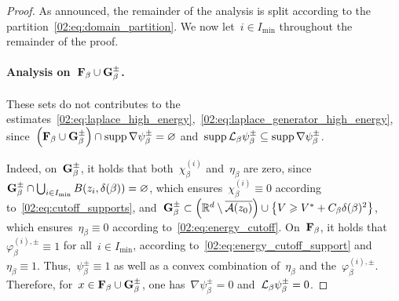 \begin{proof}
            As announced, the remainder of the analysis is split according to the partition~\eqref{02:eq:domain_partition}. We now let~$i\in I_{\min}$ throughout the remainder of the proof.
            \paragraph{Analysis on~$\mathbf{F}_\beta \cup \mathbf{G}_\beta^{\pm}$.\newline}
            These sets do not contributes to the estimates~\eqref{02:eq:laplace_high_energy},~\eqref{02:eq:laplace_generator_high_energy}, since~$\left(\mathbf{F}_\beta\cup\mathbf{G}_\beta^{\pm}\right) \cap \mathrm{supp}\,\nabla \psi^\pm_\beta = \varnothing$ and~$\mathrm{supp}\,\mathcal{L}_\beta\psi_\beta^\pm \subseteq \mathrm{supp}\,\nabla\psi_\beta^\pm$.
            
            Indeed, on~$\mathbf{G}_\beta^{\pm}$, it holds that both~$\chi_\beta^{(i)}$ and~$\eta_\beta$ are zero, since~$\mathbf{G}_\beta^{\pm}\cap \bigcup_{i\in I_{\min}}B(z_i,\delta(\beta)) = \varnothing$, which ensures~$\chi_\beta^{(i)}\equiv 0$ according to~\eqref{02:eq:cutoff_supports}, and~$\mathbf{G}_\beta^{\pm} \subset \left(\mathbb{R}^d\setminus \overline{\mathcal{A}(z_0)}\right) \cup \left\{V\geqslant V^*+C_\beta\delta(\beta)^2\right\}$, which ensures~$\eta_\beta\equiv 0$ according to~\eqref{02:eq:energy_cutoff}.
            On~$\mathbf{F}_\beta$, it holds that~$\varphi_\beta^{(i),\pm}\equiv1$ for all~$i\in I_{\min}$, according to~\eqref{02:eq:energy_cutoff_support} and~$\eta_\beta\equiv 1$. Thus,~$\psi_\beta^\pm \equiv 1$ as well as a convex combination of~$\eta_\beta$ and the~$\varphi_\beta^{(i),\pm}$.
            Therefore, for~$x\in\mathbf{F}_\beta\cup\mathbf{G}_\beta^{\pm}$, one has~$\nabla\psi_\beta^\pm=0$ and~$\mathcal{L}_\beta\psi_\beta^\pm = 0$.


\end{proof}
